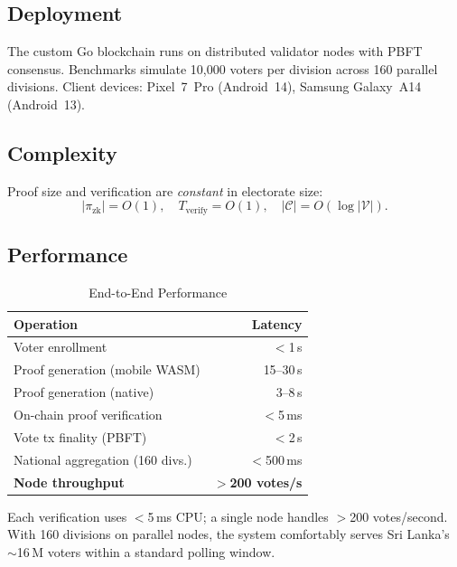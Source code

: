 \documentclass[conference]{IEEEtran}
\theoremstyle{definition}
\theoremstyle{plain}
\begin{document}
\subsection{Deployment}
The custom Go blockchain runs on distributed validator nodes with PBFT consensus. Benchmarks simulate 10{,}000 voters per division across 160 parallel divisions. Client devices: Pixel~7~Pro (Android~14), Samsung Galaxy~A14 (Android~13).

\subsection{Complexity}
Proof size and verification are \emph{constant} in electorate size:
\begin{equation}
|\pi_{\text{zk}}|=O(1),\quad T_{\text{verify}}=O(1),\quad|\mathcal{C}|=O(\log|\mathcal{V}|).
\label{eq:complexity}
\end{equation}

\subsection{Performance}

\begin{table}[t]
\caption{End-to-End Performance}
\centering\small
\begin{tabular}{@{}lr@{}}
\toprule
\textbf{Operation} & \textbf{Latency} \\
\midrule
Voter enrollment & $<$1\,s \\
Proof generation (mobile WASM) & 15--30\,s \\
Proof generation (native) & 3--8\,s \\
On-chain proof verification & $<$5\,ms \\
Vote tx finality (PBFT) & $<$2\,s \\
National aggregation (160 divs.) & $<$500\,ms \\
\midrule
\textbf{Node throughput} & \textbf{$>$200 votes/s} \\
\bottomrule
\end{tabular}
\label{tab:perf}
\end{table}

Each verification uses $<$5\,ms CPU; a single node handles $>$200 votes/second. With 160 divisions on parallel nodes, the system comfortably serves Sri Lanka's $\sim$16\,M voters within a standard polling window.
\end{document}
